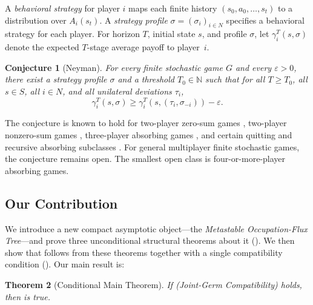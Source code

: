 \documentclass[12pt,a4paper]{article}
\newtheorem{theorem}{Theorem}[section]
\newtheorem{conjecture}[theorem]{Conjecture}
\theoremstyle{definition}
\newcommand{\eps}{\varepsilon}
\newcommand{\N}{\mathbb{N}}
\begin{document}
A \emph{behavioral strategy} for player $i$ maps each finite history $(s_0, a_0, \ldots, s_t)$ to a distribution over $A_i(s_t)$.  A \emph{strategy profile} $\sigma = (\sigma_i)_{i \in N}$ specifies a behavioral strategy for each player.  For horizon $T$, initial state $s$, and profile $\sigma$, let $\gamma_i^T(s, \sigma)$ denote the expected $T$-stage average payoff to player~$i$.

\begin{conjecture}[Neyman]
\label{conj:neyman}
For every finite stochastic game $G$ and every $\eps > 0$, there exist a strategy profile $\sigma$ and a threshold $T_0 \in \N$ such that for all $T \geq T_0$, all $s \in S$, all $i \in N$, and all unilateral deviations $\tau_i$,
\begin{equation}
\label{eq:uniform-eps-eq}
\gamma_i^T(s, \sigma) \geq \gamma_i^T(s, (\tau_i, \sigma_{-i})) - \eps.
\end{equation}
\end{conjecture}

The conjecture is known to hold for two-player zero-sum games \cite{MertensNeyman1981}, two-player nonzero-sum games \cite{Vieille2000a, Vieille2000b}, three-player absorbing games \cite{Solan1999}, and certain quitting and recursive absorbing subclasses \cite{AshkenaziGolan2024, SolanVieille2025}.  For general multiplayer finite stochastic games, the conjecture remains open.  The smallest open class is four-or-more-player absorbing games.

\subsection{Our Contribution}

We introduce a new compact asymptotic object---the \emph{Metastable Occupation-Flux Tree}---and prove three unconditional structural theorems about it ().  We then show that  follows from these theorems together with a single compatibility condition ().  Our main result is:

\begin{theorem}[Conditional Main Theorem]
\label{thm:main-conditional}
If  (Joint-Germ Compatibility) holds, then  is true.
\end{theorem}
\end{document}
